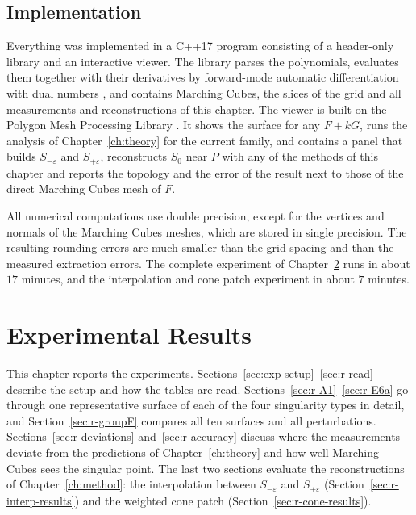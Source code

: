 \documentclass[12pt, a4paper, oneside]{book}
\theoremstyle{plain}
\theoremstyle{definition}
\theoremstyle{remark}
\theoremstyle{definition}
\begin{document}
\section{Implementation}
\label{sec:implementation}

Everything was implemented in a C++17 program consisting of a header-only library and an interactive viewer. The library parses the polynomials, evaluates them together with their derivatives by forward-mode automatic differentiation with dual numbers \cite{griewank2008evaluating}, and contains Marching Cubes, the slices of the grid and all measurements and reconstructions of this chapter. The viewer is built on the Polygon Mesh Processing Library \cite{pmp23}. It shows the surface for any $F+kG$, runs the analysis of Chapter~\ref{ch:theory} for the current family, and contains a panel that builds $S_{-\varepsilon}$ and $S_{+\varepsilon}$, reconstructs $S_0$ near $P$ with any of the methods of this chapter and reports the topology and the error of the result next to those of the direct Marching Cubes mesh of $F$.

All numerical computations use double precision, except for the vertices and normals of the Marching Cubes meshes, which are stored in single precision. The resulting rounding errors \cite{goldberg1991every} are much smaller than the grid spacing and than the measured extraction errors. The complete experiment of Chapter~\ref{ch:experiments} runs in about $17$ minutes, and the interpolation and cone patch experiment in about $7$ minutes.

\chapter{Experimental Results}
\label{ch:experiments}

This chapter reports the experiments. Sections~\ref{sec:exp-setup}--\ref{sec:r-read} describe the setup and how the tables are read. Sections~\ref{sec:r-A1}--\ref{sec:r-E6a} go through one representative surface of each of the four singularity types in detail, and Section~\ref{sec:r-groupF} compares all ten surfaces and all perturbations. Sections~\ref{sec:r-deviations} and~\ref{sec:r-accuracy} discuss where the measurements deviate from the predictions of Chapter~\ref{ch:theory} and how well Marching Cubes sees the singular point. The last two sections evaluate the reconstructions of Chapter~\ref{ch:method}: the interpolation between $S_{-\varepsilon}$ and $S_{+\varepsilon}$ (Section~\ref{sec:r-interp-results}) and the weighted cone patch (Section~\ref{sec:r-cone-results}).
\end{document}
